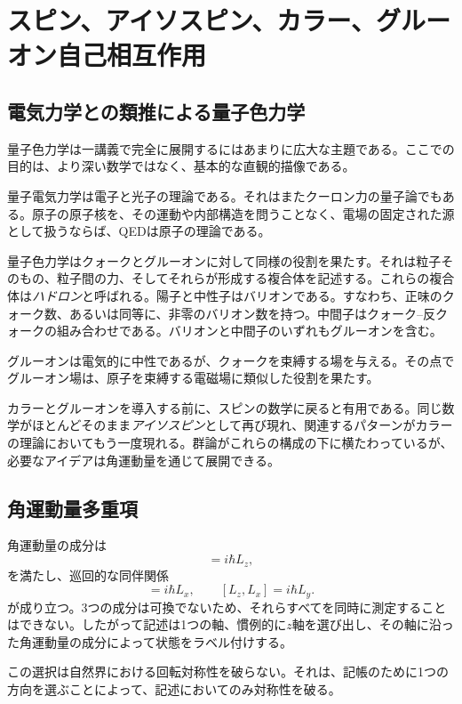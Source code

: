 \chapter{スピン、アイソスピン、カラー、グルーオン自己相互作用}

\section{電気力学との類推による量子色力学}

量子色力学は一講義で完全に展開するにはあまりに広大な主題である。ここでの目的は、より深い数学ではなく、基本的な直観的描像である。

量子電気力学は電子と光子の理論である。それはまたクーロン力の量子論でもある。原子の原子核を、その運動や内部構造を問うことなく、電場の固定された源として扱うならば、QEDは原子の理論である。

量子色力学はクォークとグルーオンに対して同様の役割を果たす。それは粒子そのもの、粒子間の力、そしてそれらが形成する複合体を記述する。これらの複合体は\emph{ハドロン}と呼ばれる。陽子と中性子はバリオンである。すなわち、正味のクォーク数、あるいは同等に、非零のバリオン数を持つ。中間子はクォーク--反クォークの組み合わせである。バリオンと中間子のいずれもグルーオンを含む。

グルーオンは電気的に中性であるが、クォークを束縛する場を与える。その点でグルーオン場は、原子を束縛する電磁場に類似した役割を果たす。

カラーとグルーオンを導入する前に、スピンの数学に戻ると有用である。同じ数学がほとんどそのまま\emph{アイソスピン}として再び現れ、関連するパターンがカラーの理論においてもう一度現れる。群論がこれらの構成の下に横たわっているが、必要なアイデアは角運動量を通じて展開できる。

\section{角運動量多重項}

角運動量の成分は
\begin{equation}
[L_x,L_y]=i\hbar L_z,
\end{equation}
を満たし、巡回的な同伴関係
\begin{equation}
[L_y,L_z]=i\hbar L_x,
\qquad
[L_z,L_x]=i\hbar L_y.
\end{equation}
が成り立つ。3つの成分は可換でないため、それらすべてを同時に測定することはできない。したがって記述は1つの軸、慣例的に\(z\)軸を選び出し、その軸に沿った角運動量の成分によって状態をラベル付けする。

この選択は自然界における回転対称性を破らない。それは、記帳のために1つの方向を選ぶことによって、記述においてのみ対称性を破る。

